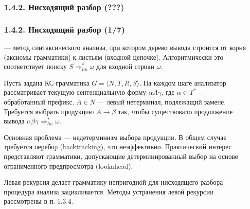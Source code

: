 \begin{frame}
\frametitle{1.4.2. Нисходящий разбор (???)}

\end{frame}

\begin{frame}
\frametitle{1.4.2. Нисходящий разбор (1/7)}

 — метод синтаксического анализа, при котором дерево вывода строится от корня (аксиомы грамматики) к листьям (входной цепочке). Алгоритмически это соответствует поиску  $S \Rightarrow_{lm}^* \omega$ для входной строки $\omega$.

Пусть задана КС-грамматика $G = \langle N, T, R, S \rangle$. На каждом шаге анализатор рассматривает текущую сентенциальную форму $\alpha A \gamma$, где $\alpha \in T^*$ — обработанный префикс, $A \in N$ — левый нетерминал, подлежащий замене. Требуется выбрать продукцию $A \to \beta$ так, чтобы существовало продолжение вывода $\alpha \beta \gamma \Rightarrow_{lm}^* \omega$.

Основная проблема — недетерминизм выбора продукции. В общем случае требуется перебор (backtracking), что неэффективно. Практический интерес представляют грамматики, допускающие детерминированный выбор на основе ограниченного предпросмотра (lookahead).

\begin{digress}
Левая рекурсия делает грамматику непригодной для нисходящего разбора — процедура анализа зацикливается. Методы устранения левой рекурсии рассмотрены в п. 1.3.4.
\end{digress}
\end{frame}

